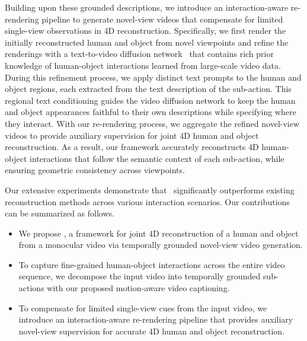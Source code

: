 Building upon these grounded descriptions, we introduce an interaction-aware re-rendering pipeline to generate novel-view videos that compensate for limited single-view observations in 4D reconstruction.
Specifically, we first render the initially reconstructed human and object from novel viewpoints and refine the renderings with a text-to-video diffusion network~\cite{wan2025wan} that contains rich prior knowledge of human-object interactions learned from large-scale video data.
During this refinement process, we apply distinct text prompts to the human and object regions, each extracted from the text description of the sub-action.
This regional text conditioning guides the video diffusion network to keep the human and object appearances faithful to their own descriptions while specifying where they interact.
With our re-rendering process, we aggregate the refined novel-view videos to provide auxiliary supervision for joint 4D human and object reconstruction.
As a result, our framework accurately reconstructs 4D human-object interactions that follow the semantic context of each sub-action, while ensuring geometric consistency across viewpoints.


Our extensive experiments demonstrate that \ourmethod~significantly outperforms existing reconstruction methods across various interaction scenarios.
Our contributions can be summarized as follows.
\begin{itemize}
\item We propose \textbf{\ourmethod}, a framework for joint 4D reconstruction of a human and object from a monocular video via temporally grounded novel-view video generation.
\item To capture fine-grained human-object interactions across the entire video sequence, we decompose the input video into temporally grounded sub-actions with our proposed motion-aware video captioning.
\item To compensate for limited single-view cues from the input video, we introduce an interaction-aware re-rendering pipeline that provides auxiliary novel-view supervision for accurate 4D human and object reconstruction.
\end{itemize}   

